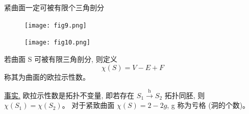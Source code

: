 \documentclass[lang=cn,10pt,thmcnt=section]{elegantbook}
\begin{document}
\begin{theorem}
     紧曲面一定可被有限个三角剖分
\end{theorem}

\begin{figure}[H]
    \centering
    \texttt{[image: fig9.png]} %
\end{figure}

\begin{figure}[H]
    \centering
    \texttt{[image: fig10.png]} %
\end{figure}

\begin{definition}[欧拉示性数]
    若曲面 S 可被有限三角剖分, 则定义
$$ \chi(S) = V-E+F $$
称其为曲面的欧拉示性数。
\end{definition}
\underline{事实.} 欧拉示性数是拓扑不变量,
即若存在 $S_1 \xrightarrow{\text{h}} S_2$ 拓扑同胚, 则 $\chi(S_1) = \chi(S_2)$。
对于紧致曲面 $\chi(S)=2-2g$, g 称为亏格 (洞的个数)。
\end{document}
